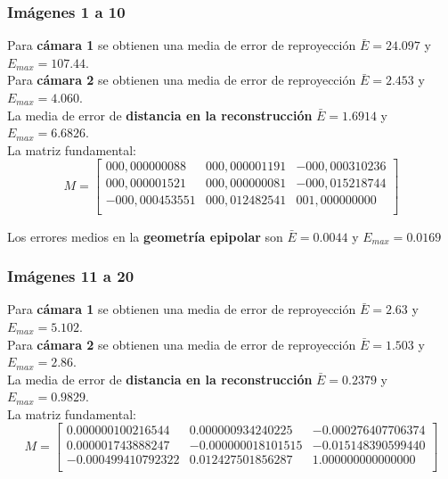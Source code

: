 \documentclass[a4paper, fontsize=11pt]{scrartcl} %
\numberwithin{equation}{section} %
\numberwithin{figure}{section} %
\numberwithin{table}{section} %
\begin{document}
	\subsubsection*{Imágenes 1 a 10}
	
	Para \textbf{cámara 1} se obtienen una media de error de reproyección $\bar{E} = 24.097$ y $E_{max} = 107.44$.\\
	Para \textbf{cámara 2} se obtienen una media de error de reproyección $\bar{E} = 2.453$ y $E_{max} = 4.060$.\\
	
	La media de error de \textbf{distancia en la reconstrucción} $\bar{E} = 1.6914$ y $E_{max} = 6.6826$.\\
	La matriz fundamental:
	\[
	M=
	\begin{bmatrix}
	000,000000088&      000,000001191   &   -000,000310236   \\
	000,000001521&      000,000000081     & -000,015218744   \\
	-000,000453551 &     000,012482541   &   001,000000000  \\
	
	\end{bmatrix}
	\]
	
	Los errores medios en la \textbf{geometría epipolar} son $\bar{E} = 0.0044$ y $E_{max} = 0.0169$
	
	\subsubsection*{Imágenes 11 a 20}
	
	Para \textbf{cámara 1} se obtienen una media de error de reproyección $\bar{E} = 2.63$ y $E_{max} = 5.102$.\\
	Para \textbf{cámara 2} se obtienen una media de error de reproyección $\bar{E} = 1.503$ y $E_{max} = 2.86$.\\
	
	La media de error de \textbf{distancia en la reconstrucción} $\bar{E} = 0.2379$ y $E_{max} = 0.9829$.\\
	La matriz fundamental:
	\[
	M=
	\begin{bmatrix}
	0.000000100216544&	0.000000934240225&	-0.000276407706374 \\
	0.000001743888247&	-0.000000018101515&	-0.015148390599440 \\
	-0.000499410792322&	0.012427501856287&	1.000000000000000  \\
	
	\end{bmatrix}
	\]
	
\end{document}
